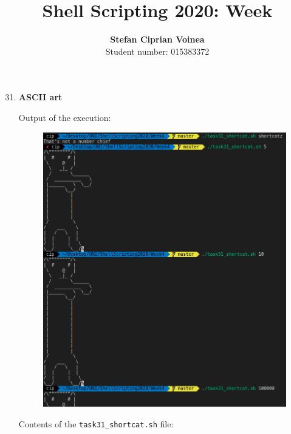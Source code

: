 \documentclass[9pt]{article}
\begin{document}
\title{Shell Scripting 2020: Week }
\author{\textbf{Stefan Ciprian Voinea}\\Student number: 015383372}
\maketitle


\begin{enumerate}
	
	\setcounter{enumi}{30}
	
	\item \textbf{ASCII art}
	
		Output of the execution:
		\begin{figure}[h!]
			\centering
			\includegraphics[width=14cm]{img/31.png}
		\end{figure}
	
		\newpage
		Contents of the \texttt{task31\_shortcat.sh} file:


\end{enumerate}
\end{document}
